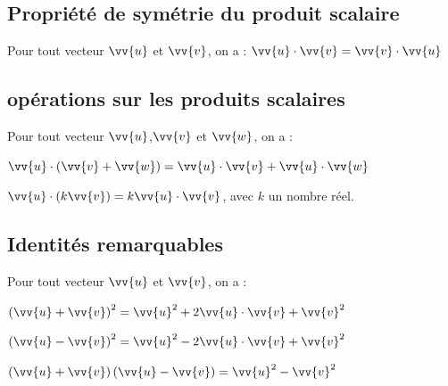     \subsection{Propriété de symétrie du produit scalaire}
    
    \begin{propriete}
        Pour tout vecteur $\vv{u}$ et $\vv{v}$, on a : $\vv{u}\cdot \vv{v}= \vv{v}\cdot \vv{u}$ 
    \end{propriete}
    
    
    \subsection{opérations sur les produits scalaires}
    
    \begin{propriete}
        Pour tout vecteur $\vv{u}$,$\vv{v}$ et $\vv{w}$, on a :
        \begin{enumDef}
            \item $\vv{u} \cdot (\vv{v}+\vv{w})=\vv{u} \cdot \vv{v}+\vv{u} \cdot \vv{w}$
            \item $\vv{u} \cdot (k \vv{v})=k \vv{u} \cdot \vv{v}$, avec $k$ un nombre réel.
        \end{enumDef}
    \end{propriete}

    \subsection{Identités remarquables}
    
    \begin{propriete}
        Pour tout vecteur $\vv{u}$ et $\vv{v}$, on a :
        \begin{enumDef}
            \item $\left(\vv{u}+\vv{v}\right)^2=\vv{u}^2 +2\vv{u} \cdot \vv{v}+\vv{v}^2$
            \item $\left(\vv{u}-\vv{v}\right)^2=\vv{u}^2 -2\vv{u} \cdot \vv{v}+\vv{v}^2$
            \item $\left(\vv{u}+\vv{v}\right)\left(\vv{u}-\vv{v}\right)=\vv{u}^2-\vv{v}^2$
        \end{enumDef}
    \end{propriete}
    
